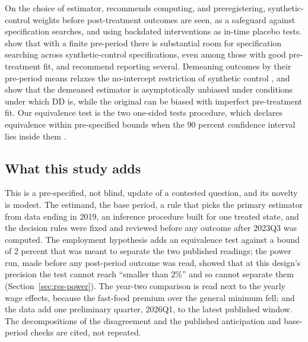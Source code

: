 On the choice of estimator, \citet{abadie2021using} recommends computing, and preregistering,
synthetic-control weights before post-treatment outcomes are seen, as a safeguard against
specification searches, and using backdated interventions as in-time placebo tests.
\citet{ferman2020cherry} show that with a finite pre-period there is substantial room for
specification searching across synthetic-control specifications, even among those with good
pre-treatment fit, and recommend reporting several. Demeaning outcomes by their pre-period means
relaxes the no-intercept restriction of synthetic control \citep{doudchenko2016balancing}, and
\citet{ferman2021synthetic} show that the demeaned estimator is asymptotically unbiased under
conditions under which DD is, while the original can be biased with imperfect pre-treatment fit.
Our equivalence test is the two one-sided tests procedure, which declares equivalence within
pre-specified bounds when the 90 percent confidence interval lies inside them
\citep{schuirmann1987comparison,lakens2017equivalence}.

\subsection{What this study adds}

This is a pre-specified, not blind, update of a contested question, and its novelty is modest. The
estimand, the base period, a rule that picks the primary estimator from data ending in 2019, an
inference procedure built for one treated state, and the decision rules were fixed and reviewed
before any outcome after 2023Q3 was computed. The employment hypothesis adds an equivalence test
against a bound of 2 percent that was meant to separate the two published readings; the power run,
made before any post-period outcome was read, showed that at this design's precision the test
cannot reach ``smaller than 2\%'' and so cannot separate them (Section~\ref{sec:res-power}). The
year-two comparison is
read next to the yearly wage effects, because the fast-food premium over the general minimum fell;
and the data add one preliminary quarter, 2026Q1, to the latest published window. The
decompositions of the disagreement and the published anticipation and base-period checks are
cited, not repeated.
